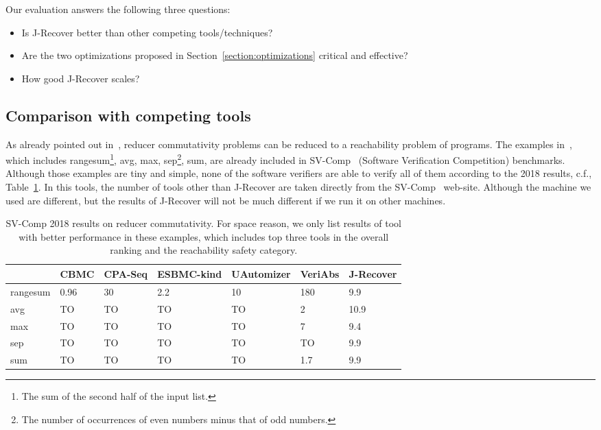 \documentclass{llncs}
\begin{document}
Our evaluation answers the following three questions:
\begin{itemize}
	\item Is J-Recover better than other competing tools/techniques?
	\item Are the two optimizations proposed in Section~\ref{section:optimizations} critical and effective?
	\item How good J-Recover scales?
\end{itemize} 

\subsection{Comparison with competing tools}
As already pointed out in~\cite{ChenHSW15}, reducer commutativity problems can be reduced to a reachability problem of programs. 
The examples in~\cite{ChenHSW15}, which includes \textsf{rangesum}\footnote{The sum of the second half of the input list.}, \textsf{avg}, \textsf{max}, \textsf{sep}\footnote{The number of occurrences of even numbers minus that of odd numbers.}, \textsf{sum}, are already included in SV-Comp~\cite{svcomp} (Software Verification Competition) benchmarks.
Although those examples are tiny and simple, none of the software verifiers are able to verify all of them according to the 2018 results, c.f., Table~\ref{tab:svcomp}. In this tools, the number of tools other than J-Recover are taken directly from the SV-Comp~\cite{svcomp} web-site. Although the machine we used are different, but the results of J-Recover will not be much different if we run it on other machines. 

\begin{table}
	\begin{tabular}{|l|l|l|l|l|l|l|}
\hline
		& \small CBMC\cite{cbmc2} 	& \small CPA-Seq\cite{cpachecker} & \small  ESBMC-kind\cite{esbmc} & \small  UAutomizer\cite{uautomizer} &\small  VeriAbs\cite{veriabs} &\small J-Recover\\
\hline
\hline
\small \textsf{rangesum}	& 0.96 	   & 30 		 & 2.2 				 &  10				 & 180       &9.9\\
\hline
\small \textsf{avg}			 &  TO      &  TO		  &  TO				 &  TO				 &  2          &10.9\\
\hline
\small \textsf{max}		    &  TO      &  TO		 &  TO				& TO				 &  7         &9.4\\
\hline
\small \textsf{sep}		     &  TO      &  TO		  &  TO				 & TO				 &  TO        &9.9\\
\hline
\small \textsf{sum}		    &  TO      &  TO		 &  TO				& TO				&  1.7       &9.9\\
\hline
	\end{tabular}
	\caption{SV-Comp 2018 results on reducer commutativity. For space reason, we only list results of tool with better performance in these examples, which includes top three tools in the overall ranking and the reachability safety category.}
	\label{tab:svcomp}
\end{table}
\end{document}
